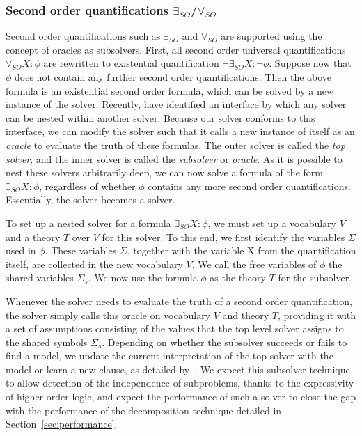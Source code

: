 \subsubsection{Second order quantifications $\exists_{SO}$/$\forall_{SO}$}
Second order quantifications such as $\exists_{SO}$ and $\forall_{SO}$ are supported using the concept of oracles as subsolvers.
First, all second order universal quantifications $\forall_{SO} X : \phi$ are rewritten to existential quantification $\neg \exists_{SO} X : \neg \phi$.
Suppose now that $\phi$ does not contain any further second order quantifications.
Then the above formula is an existential second order formula, which can be solved by a new instance of the \NP solver.
Recently, \cite{AAAIW1612603} have identified an interface by which any solver can be nested within another solver.
Because our \NP solver conforms to this interface, we can modify the \NP solver such that it calls a new instance of itself as an \emph{oracle} to evaluate the truth of these formulas.
The outer solver is called the \emph{top solver}, and the inner solver is called the \emph{subsolver} or \emph{oracle}.
As it is possible to nest these solvers arbitrarily deep, we can now solve a formula of the form $\exists_{SO} X : \phi$, regardless of whether $\phi$ contains any more second order quantifications.
Essentially, the \NP solver becomes a \QBF solver.

To set up a nested solver for a formula $\exists_{SO} X : \phi$, we must set up a vocabulary $V$ and a theory $T$ over $V$ for this solver. 
To this end, we first identify the variables $\Sigma$ used in $\phi$.
These variables $\Sigma$, together with the variable X from the quantification itself, are collected in the new vocabulary $V$. 
We call the free variables of $\phi$ the shared variables $\Sigma_s$.
We now use the formula $\phi$ as the theory $T$ for the subsolver.

Whenever the solver needs to evaluate the truth of a second order quantification, the solver simply calls this oracle on vocabulary $V$ and theory $T$, providing it with a set of assumptions consisting of the values that the top level solver assigns to the shared symbols $\Sigma_s$.
Depending on whether the subsolver succeeds or fails to find a model, we update the current interpretation of the top solver with the model or learn a new clause, as detailed by~\cite{AAAIW1612603}.
We expect this subsolver technique to allow detection of the independence of subproblems, thanks to the expressivity of higher order logic, and expect the performance of such a solver to close the gap with the performance of the decomposition technique detailed in Section~\ref{sec:performance}.

